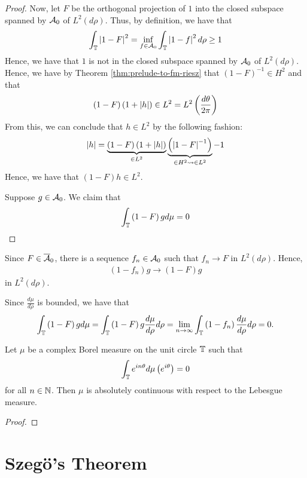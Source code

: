 \begin{proof}
Now, let $F$ be the orthogonal projection of $1$ into the closed subspace spanned by ${\cal A}_{0}$ of $L^{2} \left( d\rho \right)$. Thus, by definition, we have that 
\begin{equation*}
    \int_{\mathbb T} \left\lvert 1-F \right\rvert^{2} = \inf_{f\in {\cal A}_0} \int_{\mathbb T} \left\lvert 1-f \right\rvert^{2} d\rho \ge 1
\end{equation*}
Hence, we have that $1$ is not in the closed subspace spanned by ${\cal A}_{0}$ of $L^{2} (d\rho)$. Hence, we have by Theorem \ref{thm:prelude-to-fm-riesz} that $\left( 1-F \right)^{-1} \in H^{2}$ and that 
\begin{equation*}
    \left( 1-F \right) \left( 1+\left\lvert h \right\rvert \right) \in L^{2} = L^{2} \left( \frac{d\theta}{2\pi} \right)
\end{equation*}
From this, we can conclude that $h \in L^{2}$ by the following fashion:
\begin{equation*}
    \left\lvert h \right\rvert = \underbrace{\left( 1-F \right) \left( 1+ \left\lvert h \right\rvert \right)}_{\in L^{2}} \underbrace{\left( \left\lvert 1-F \right\rvert^{-1} \right)}_{\in H^{2} \leadsto \in L^{2}} -1
\end{equation*}
Hence, we have that $(1-F)h \in L^{2}$.

Suppose $g\in {\cal A}_{0}$. We claim that
\begin{align*}
    \int_{\mathbb T} \left( 1-F \right) g d\mu = 0
\end{align*}
\end{proof}

Since $F\in \overline {{\cal A}}_{0}$, there is a sequence $f_{n} \in {\cal A}_{0}$ such that $f_{n} \to F$ in $L^{2} (d\rho)$. Hence,
\begin{align*}
    (1-f_{n})g \to \left( 1-F \right)g
\end{align*}
in $L^{2} \left( d\rho \right)$.

Since $\frac{d\mu}{d\rho}$ is bounded, we have that 
\begin{equation*}
    \int_{\mathbb T} \left( 1-F \right) g d\mu = \int_{\mathbb T} \left( 1-F \right) g \frac{d\mu}{d\rho} d\rho = \lim_{n\to \infty} \int_{\mathbb T} \left( 1-f_{n} \right) \frac{d\mu}{d\rho} d\rho = 0 \text{.}
\end{equation*}



\begin{theorem}
    Let $\mu$ be a complex Borel measure on the unit circle $\mathbb T$ such that
    \begin{equation*}
	\int_{\mathbb T} e^{in\theta} d\mu \left( e^{i\theta} \right) =0
    \end{equation*}
    for all $n\in\mathbb N$. Then $\mu$ is absolutely continuous with respect to the Lebesgue measure.
    \label{thm:f-and-m-riesz}
\end{theorem}
\begin{proof}
    
\end{proof}
\section{Szegö's Theorem}
